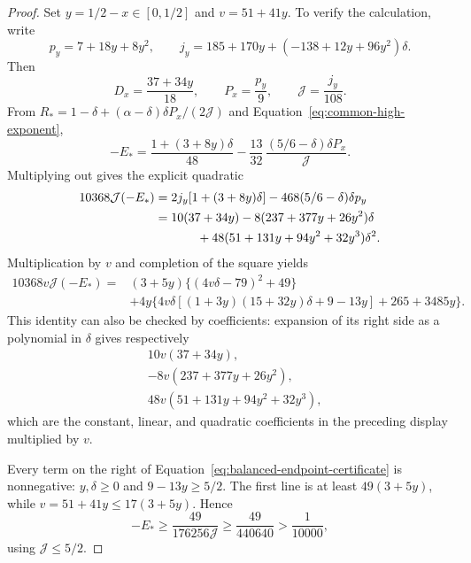 \documentclass[11pt,a4paper]{article}
\numberwithin{equation}{section}
\numberwithin{figure}{section}
\theoremstyle{definition}
\theoremstyle{remark}
\begin{document}
\begin{proof}
Set \(y=1/2-x\in[0,1/2]\) and \(v=51+41y\).  To verify the
calculation, write
\[
 p_y=7+18y+8y^2,\qquad
 j_y=185+170y+(-138+12y+96y^2)\delta.
\]
Then
\[
 D_x=\frac{37+34y}{18},\qquad
 P_x=\frac{p_y}{9},\qquad
 \mathcal J=\frac{j_y}{108}.
\]
From \(R_*=1-\delta+(\alpha-\delta)\delta P_x/(2\mathcal J)\)
and Equation~\eqref{eq:common-high-exponent},
\[
 -E_*=
 \frac{1+(3+8y)\delta}{48}
 -\frac{13}{32}\,
   \frac{(5/6-\delta)\delta P_x}{\mathcal J}.
\]
Multiplying out gives the explicit quadratic
\[
 \begin{split}
 10368\mathcal J(-E_*)
 &=2j_y[1+(3+8y)\delta]
     -468(5/6-\delta)\delta p_y\\
 &=10(37+34y)
   -8(237+377y+26y^2)\delta\\
 &\hspace{12mm}
   +48(51+131y+94y^2+32y^3)\delta^2.
 \end{split}
\]
Multiplication by \(v\) and completion of the square yields
\begin{equation}
 \begin{aligned}
 10368v\mathcal J(-E_*)
 ={}&(3+5y)\bigl\{(4v\delta-79)^2+49\bigr\}\\
 &+4y\bigl\{
 4v\delta[(1+3y)(15+32y)\delta+9-13y]
       +265+3485y\bigr\}.
 \end{aligned}
 \label{eq:balanced-endpoint-certificate}
\end{equation}
This identity can also be checked by coefficients: expansion of
its right side as a polynomial in \(\delta\) gives respectively
\[
 \begin{split}
 &10v(37+34y),\\
 &-8v(237+377y+26y^2),\\
 &48v(51+131y+94y^2+32y^3),
 \end{split}
\]
which are the constant, linear, and quadratic coefficients in
the preceding display multiplied by \(v\).

Every term on the right of
Equation~\eqref{eq:balanced-endpoint-certificate} is nonnegative:
\(y,\delta\ge0\) and \(9-13y\ge5/2\).
The first line is at least \(49(3+5y)\), while
\(v=51+41y\le17(3+5y)\).  Hence
\[
 -E_*\ge\frac{49}{176256\mathcal J}
       \ge\frac{49}{440640}>\frac1{10000},
\]
using \(\mathcal J\le5/2\).
\end{proof}
\end{document}
